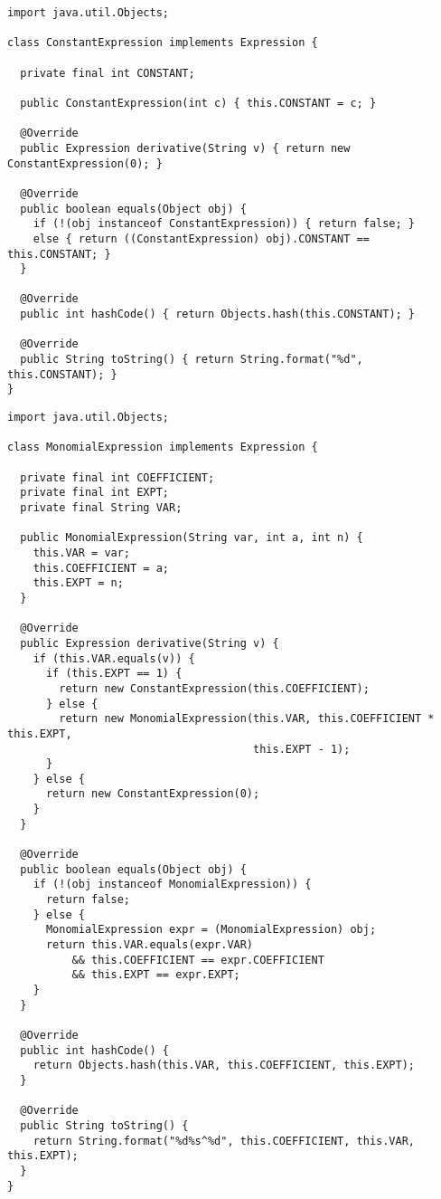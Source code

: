 \begin{cl}[]{}
\begin{lstlisting}[language=MyJava]
import java.util.Objects;

class ConstantExpression implements Expression {

  private final int CONSTANT;

  public ConstantExpression(int c) { this.CONSTANT = c; }

  @Override
  public Expression derivative(String v) { return new ConstantExpression(0); }

  @Override
  public boolean equals(Object obj) {
    if (!(obj instanceof ConstantExpression)) { return false; }
    else { return ((ConstantExpression) obj).CONSTANT == this.CONSTANT; }
  }

  @Override
  public int hashCode() { return Objects.hash(this.CONSTANT); }

  @Override
  public String toString() { return String.format("%d", this.CONSTANT); }
}
\end{lstlisting}
\end{cl}

\begin{cl}[]{}
\begin{lstlisting}[language=MyJava]
import java.util.Objects;

class MonomialExpression implements Expression {

  private final int COEFFICIENT;
  private final int EXPT;
  private final String VAR;

  public MonomialExpression(String var, int a, int n) { 
    this.VAR = var;
    this.COEFFICIENT = a;
    this.EXPT = n;
  }

  @Override
  public Expression derivative(String v) { 
    if (this.VAR.equals(v)) {
      if (this.EXPT == 1) {
        return new ConstantExpression(this.COEFFICIENT);
      } else {
        return new MonomialExpression(this.VAR, this.COEFFICIENT * this.EXPT, 
                                      this.EXPT - 1);
      }
    } else {
      return new ConstantExpression(0);
    } 
  }

  @Override
  public boolean equals(Object obj) {
    if (!(obj instanceof MonomialExpression)) { 
      return false; 
    } else { 
      MonomialExpression expr = (MonomialExpression) obj;
      return this.VAR.equals(expr.VAR)
          && this.COEFFICIENT == expr.COEFFICIENT 
          && this.EXPT == expr.EXPT;
    }
  }

  @Override
  public int hashCode() { 
    return Objects.hash(this.VAR, this.COEFFICIENT, this.EXPT); 
  }

  @Override
  public String toString() { 
    return String.format("%d%s^%d", this.COEFFICIENT, this.VAR, this.EXPT); 
  }
}
\end{lstlisting}
\end{cl}

